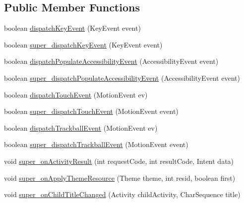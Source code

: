\subsection*{Public Member Functions}
\begin{DoxyCompactItemize}
\item 
boolean \hyperlink{classorg_1_1kde_1_1necessitas_1_1origo_1_1_qt_activity_ac22d19aae04f89fa80184badce868514}{dispatch\-Key\-Event} (Key\-Event event)
\item 
boolean \hyperlink{classorg_1_1kde_1_1necessitas_1_1origo_1_1_qt_activity_af8369ee2d06164a30821c804d1b16158}{super\-\_\-dispatch\-Key\-Event} (Key\-Event event)
\item 
boolean \hyperlink{classorg_1_1kde_1_1necessitas_1_1origo_1_1_qt_activity_af91f9ee6574ab6a42ee452384eb92c49}{dispatch\-Populate\-Accessibility\-Event} (Accessibility\-Event event)
\item 
boolean \hyperlink{classorg_1_1kde_1_1necessitas_1_1origo_1_1_qt_activity_a6141c947466dec12fca641c5af1726e7}{super\-\_\-dispatch\-Populate\-Accessibility\-Event} (Accessibility\-Event event)
\item 
boolean \hyperlink{classorg_1_1kde_1_1necessitas_1_1origo_1_1_qt_activity_aa002f879af3c4621a55bcb83a999fbb3}{dispatch\-Touch\-Event} (Motion\-Event ev)
\item 
boolean \hyperlink{classorg_1_1kde_1_1necessitas_1_1origo_1_1_qt_activity_a14b00aace71f0508a6830a849502c7ac}{super\-\_\-dispatch\-Touch\-Event} (Motion\-Event event)
\item 
boolean \hyperlink{classorg_1_1kde_1_1necessitas_1_1origo_1_1_qt_activity_ad8788d4e182e9e92afcd68ec0901dc0e}{dispatch\-Trackball\-Event} (Motion\-Event ev)
\item 
boolean \hyperlink{classorg_1_1kde_1_1necessitas_1_1origo_1_1_qt_activity_ade426c508352ce6f10dcffd509974747}{super\-\_\-dispatch\-Trackball\-Event} (Motion\-Event event)
\item 
void \hyperlink{classorg_1_1kde_1_1necessitas_1_1origo_1_1_qt_activity_ab37541f1d391cbbf16a9c99dc33f8cdb}{super\-\_\-on\-Activity\-Result} (int request\-Code, int result\-Code, Intent data)
\item 
void \hyperlink{classorg_1_1kde_1_1necessitas_1_1origo_1_1_qt_activity_a9297f08171c93a4041760e918cc72664}{super\-\_\-on\-Apply\-Theme\-Resource} (Theme theme, int resid, boolean first)
\item 
void \hyperlink{classorg_1_1kde_1_1necessitas_1_1origo_1_1_qt_activity_a8b2b111b57900a453b64eda1f15bc5db}{super\-\_\-on\-Child\-Title\-Changed} (Activity child\-Activity, Char\-Sequence title)

\end{DoxyCompactItemize}
